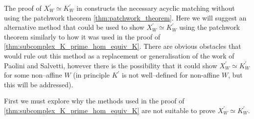 \documentclass[class=article, crop=false]{standalone}
\begin{document}
The proof of $X^\prime_W \simeq K^\prime_W$ in \cite[Section 8]{paolini_salvetti_kpi1_2021} constructs the necessary acyclic matching without using the patchwork theorem \cref{thm:patchwork_theorem}. Here we will suggest an alternative method that could be used to show $X^\prime_W \simeq K^\prime_W$ using the patchwork theorem similarly to how it was used in the proof of \cref{thm:subcomplex_K_prime_hom_equiv_K}. There are obvious obstacles that would rule out this method as a replacement or generalisation of the work of Paolini and Salvetti, however there is the possibility that it could show $X^\prime_W \simeq K^\prime_W$ for some non--affine $W$ (in principle $K^\prime$ is not well--defined for non-affine $W$, but this will be addressed).

First we must explore why the methods used in the proof of \cref{thm:subcomplex_K_prime_hom_equiv_K} are not suitable to prove $X^\prime_W \simeq K^\prime_W$.
\end{document}
